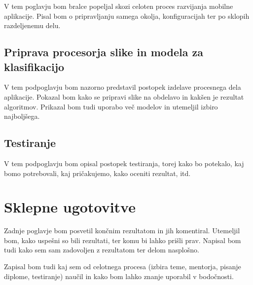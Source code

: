 \documentclass[a4paper, 12pt]{book}
\begin{document}
V tem poglavju bom bralce popeljal skozi celoten proces razvijanja mobilne aplikacije. Pisal bom o pripravljanju samega okolja, konfiguracijah ter po sklopih razdeljenemu delu.

\section{Priprava procesorja slike in modela za klasifikacijo}

V tem podpoglavju bom nazorno predstavil postopek izdelave procesnega dela aplikacije. Pokazal bom kako se pripravi slike na obdelavo in kakšen je rezultat algoritmov. Prikazal bom tudi uporabo več modelov in utemeljil izbiro najboljšega.

\section{Testiranje}

V tem podpoglavju bom opisal postopek testiranja, torej kako bo potekalo, kaj bomo potrebovali, kaj pričakujemo, kako oceniti rezultat, itd.


\chapter{Sklepne ugotovitve}
\label{ch6}

Zadnje poglavje bom posvetil končnim rezultatom in jih komentiral. Utemeljil bom, kako uspešni so bili rezultati, ter komu bi lahko prišli prav. Napisal bom tudi kako sem sam zadovoljen z rezultatom ter delom nasplošno.

Zapisal bom tudi kaj sem od celotnega procesa (izbira teme, mentorja, pisanje diplome, testiranje) naučil in kako bom lahko znanje uporabil v bodočnosti.


\newpage %
\ \\
\clearpage
{}


\end{document}

